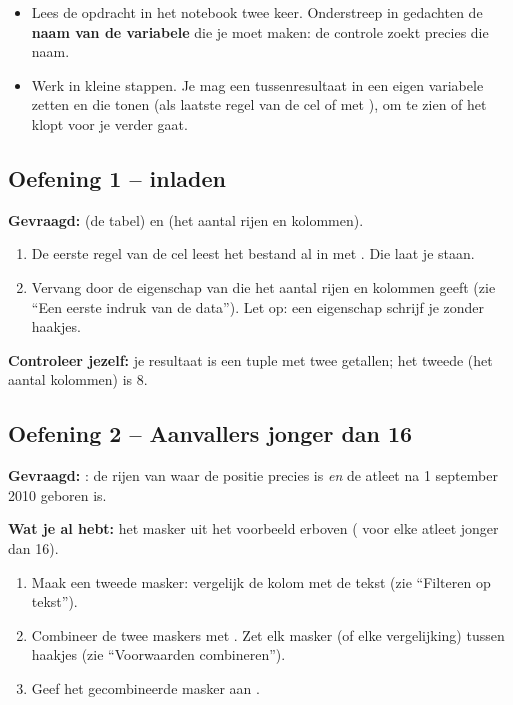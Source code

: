 \documentclass[11pt,a4paper]{article}
\begin{document}
\begin{itemize}
  \item Lees de opdracht in het notebook twee keer. Onderstreep in
        gedachten de \textbf{naam van de variabele} die je moet maken: de
        controle zoekt precies die naam.
  \item Werk in kleine stappen. Je mag een tussenresultaat in een eigen
        variabele zetten en die tonen (als laatste regel van de cel of met
        ), om te zien of het klopt voor je verder gaat.
\end{itemize}

\subsection*{Oefening 1 --  inladen}

\textbf{Gevraagd:}  (de tabel) en 
(het aantal rijen en kolommen).

\begin{enumerate}
  \item De eerste regel van de cel leest het bestand al in met
        . Die laat je staan.
  \item Vervang  door de eigenschap van  die het
        aantal rijen en kolommen geeft (zie ``Een eerste indruk van de
        data''). Let op: een eigenschap schrijf je zonder haakjes.
\end{enumerate}

\textbf{Controleer jezelf:} je resultaat is een tuple met twee getallen;
het tweede (het aantal kolommen) is 8.

\subsection*{Oefening 2 -- Aanvallers jonger dan 16}

\textbf{Gevraagd:} : de rijen van
 waar de positie precies  is
\emph{en} de atleet na 1 september 2010 geboren is.

\textbf{Wat je al hebt:} het masker  uit het
voorbeeld erboven ( voor elke atleet jonger dan 16).

\begin{enumerate}
  \item Maak een tweede masker: vergelijk de kolom  met de
        tekst  (zie ``Filteren op tekst'').
  \item Combineer de twee maskers met \code{\&}. Zet elk masker (of elke
        vergelijking) tussen haakjes (zie ``Voorwaarden combineren'').
  \item Geef het gecombineerde masker aan .
\end{enumerate}
\end{document}
